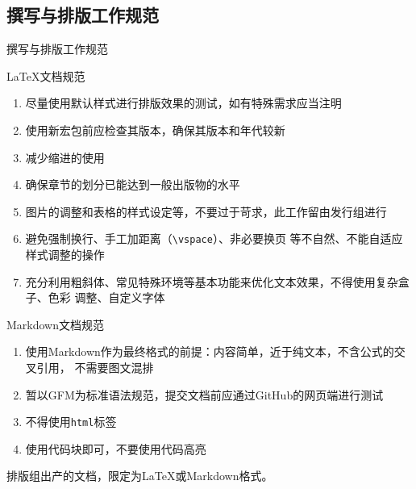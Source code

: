 \documentclass[10pt]{beamer}
\begin{document}
\subsection{撰写与排版工作规范}
\begin{frame}{撰写与排版工作规范}
\begin{block}{\LaTeX{}文档规范}\scriptsize
\begin{enumerate}
    \item 尽量使用默认样式进行排版效果的测试，如有特殊需求应当注明
    \item 使用新宏包前应检查其版本，确保其版本和年代较新
    \item 减少缩进的使用
    \item 确保章节的划分已能达到一般出版物的水平
    \item 图片的调整和表格的样式设定等，不要过于苛求，此工作留由发行组进行
    \item 避免强制换行、手工加距离（\texttt{\textbackslash{}vspace}）、非必要换页
    等不自然、不能自适应样式调整的操作
    \item 充分利用粗斜体、常见特殊环境等基本功能来优化文本效果，不得使用复杂盒子、色彩
    调整、自定义字体
\end{enumerate}
\end{block}

\begin{alertblock}{Markdown文档规范}\scriptsize
\begin{enumerate}
    \item 使用Markdown作为最终格式的前提：内容简单，近于纯文本，不含公式的交叉引用，
    不需要图文混排
    \item 暂以GFM为标准语法规范，提交文档前应通过GitHub的网页端进行测试
    \item 不得使用\texttt{html}标签
    \item 使用代码块即可，不要使用代码高亮
\end{enumerate}
\end{alertblock}

\centering\kaishu 排版组出产的文档，限定为\LaTeX{}或Markdown格式。

\end{frame}
\end{document}
